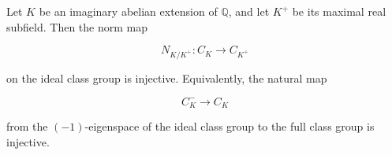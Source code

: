 Let $K$ be an imaginary abelian extension of $\mathbb{Q}$, and let $K^+$ be its maximal real subfield. Then the norm map

$$
N_{K/K^+}: C_K \longrightarrow C_{K^+}
$$

on the ideal class group is injective. Equivalently, the natural map

$$
C_K^- \longrightarrow C_K
$$

from the $(-1)$-eigenspace of the ideal class group to the full class group is injective.
